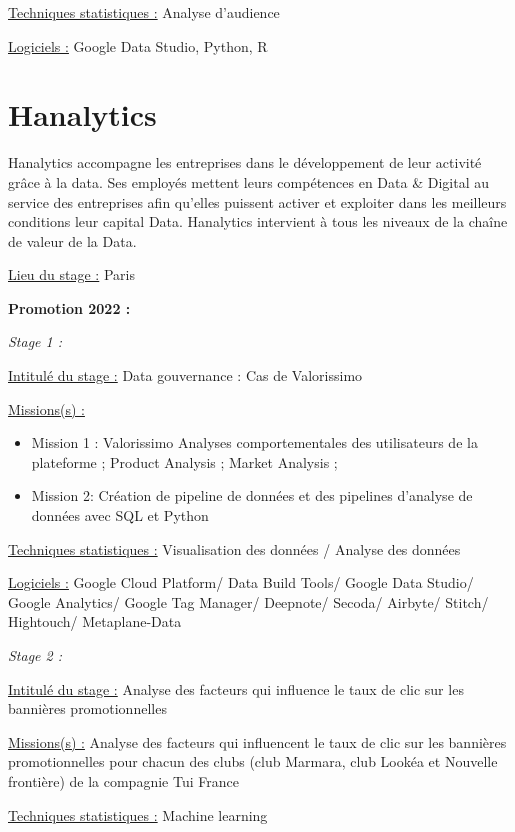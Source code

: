 \documentclass[
  letterpaper,
  DIV=11,
  numbers=noendperiod]{scrreprt}
\begin{document}
\uline{Techniques statistiques :} Analyse d'audience

\uline{Logiciels :} Google Data Studio, Python, R

\hypertarget{hanalytics}{%
\section{\texorpdfstring{\textbf{Hanalytics}}{Hanalytics}}\label{hanalytics}}

Hanalytics accompagne les entreprises dans le développement de leur
activité grâce à la data. Ses employés mettent leurs compétences en Data
\& Digital au service des entreprises afin qu'elles puissent activer et
exploiter dans les meilleurs conditions leur capital Data. Hanalytics
intervient à tous les niveaux de la chaîne de valeur de la Data.

\uline{Lieu du stage :} Paris

\textbf{Promotion 2022 :}

\emph{Stage 1 :}

\uline{Intitulé du stage :} Data gouvernance : Cas de Valorissimo

\uline{Missions(s) :}

\begin{itemize}
\item
  Mission 1 : Valorissimo Analyses comportementales des utilisateurs de
  la plateforme ; Product Analysis ; Market Analysis ;
\item
  Mission 2: Création de pipeline de données et des pipelines d'analyse
  de données avec SQL et Python
\end{itemize}

\uline{Techniques statistiques :} Visualisation des données / Analyse
des données

\uline{Logiciels :} Google Cloud Platform/ Data Build Tools/ Google Data
Studio/ Google Analytics/ Google Tag Manager/ Deepnote/ Secoda/ Airbyte/
Stitch/ Hightouch/ Metaplane-Data

\emph{Stage 2 :}

\uline{Intitulé du stage :} Analyse des facteurs qui influence le taux
de clic sur les bannières promotionnelles

\uline{Missions(s) :} Analyse des facteurs qui influencent le taux de
clic sur les bannières promotionnelles pour chacun des clubs (club
Marmara, club Lookéa et Nouvelle frontière) de la compagnie Tui France

\uline{Techniques statistiques :} Machine learning
\end{document}
